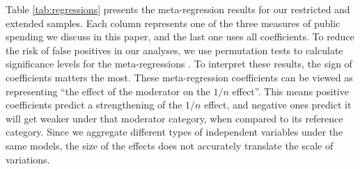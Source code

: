 \documentclass[11pt,a4paper,]{article}
\begin{document}
Table \ref{tab:regressions} presents the meta-regression results for our
restricted and extended samples. Each column represents one of the three
measures of public spending we discuss in this paper, and the last one
uses all coefficients. To reduce the risk of false positives in our
analyses, we use permutation tests to calculate significance levels for
the meta-regressions \citep{higgins2004controlling}. To interpret these
results, the sign of coefficients matters the most. These
meta-regression coefficients can be viewed as representing ``the effect
of the moderator on the \(1/n\) effect''. This means positive
coefficients predict a strengthening of the \(1/n\) effect, and negative
ones predict it will get weaker under that moderator category, when
compared to its reference category. Since we aggregate different types
of independent variables under the same models, the size of the effects
does not accurately translate the scale of variations.

\vspace{0.5cm}
\end{document}

